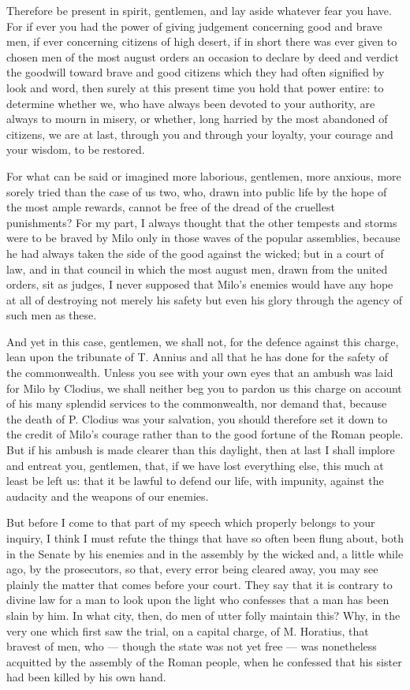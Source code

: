  Therefore be present in spirit, gentlemen, and lay aside whatever fear you have. For if ever you had the power of giving judgement concerning good and brave men, if ever concerning citizens of high desert, if in short there was ever given to chosen men of the most august orders an occasion to declare by deed and verdict the goodwill toward brave and good citizens which they had often signified by look and word, then surely at this present time you hold that power entire: to determine whether we, who have always been devoted to your authority, are always to mourn in misery, or whether, long harried by the most abandoned of citizens, we are at last, through you and through your loyalty, your courage and your wisdom, to be restored.

 For what can be said or imagined more laborious, gentlemen, more anxious, more sorely tried than the case of us two, who, drawn into public life by the hope of the most ample rewards, cannot be free of the dread of the cruellest punishments? For my part, I always thought that the other tempests and storms were to be braved by Milo only in those waves of the popular assemblies, because he had always taken the side of the good against the wicked; but in a court of law, and in that council in which the most august men, drawn from the united orders, sit as judges, I never supposed that Milo's enemies would have any hope at all of destroying not merely his safety but even his glory through the agency of such men as these.

 And yet in this case, gentlemen, we shall not, for the defence against this charge, lean upon the tribunate of T. Annius and all that he has done for the safety of the commonwealth. Unless you see with your own eyes that an ambush was laid for Milo by Clodius, we shall neither beg you to pardon us this charge on account of his many splendid services to the commonwealth, nor demand that, because the death of P. Clodius was your salvation, you should therefore set it down to the credit of Milo's courage rather than to the good fortune of the Roman people. But if his ambush is made clearer than this daylight, then at last I shall implore and entreat you, gentlemen, that, if we have lost everything else, this much at least be left us: that it be lawful to defend our life, with impunity, against the audacity and the weapons of our enemies.

 But before I come to that part of my speech which properly belongs to your inquiry, I think I must refute the things that have so often been flung about, both in the Senate by his enemies and in the assembly by the wicked and, a little while ago, by the prosecutors, so that, every error being cleared away, you may see plainly the matter that comes before your court. They say that it is contrary to divine law for a man to look upon the light who confesses that a man has been slain by him. In what city, then, do men of utter folly maintain this? Why, in the very one which first saw the trial, on a capital charge, of M. Horatius, that bravest of men, who --- though the state was not yet free --- was nonetheless acquitted by the assembly of the Roman people, when he confessed that his sister had been killed by his own hand.

